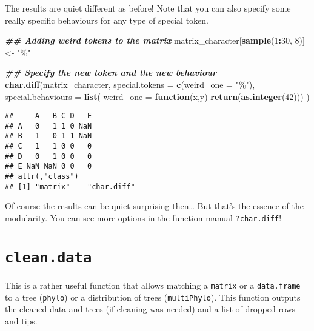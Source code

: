 \documentclass[
]{book}
\newenvironment{Shaded}{\begin{snugshade}}{\end{snugshade}}
\newcommand{\AttributeTok}[1]{\textcolor[rgb]{0.13,0.29,0.53}{#1}}
\newcommand{\ControlFlowTok}[1]{\textcolor[rgb]{0.13,0.29,0.53}{\textbf{#1}}}
\newcommand{\DecValTok}[1]{\textcolor[rgb]{0.00,0.00,0.81}{#1}}
\newcommand{\DocumentationTok}[1]{\textcolor[rgb]{0.56,0.35,0.01}{\textbf{\textit{#1}}}}
\newcommand{\FunctionTok}[1]{\textcolor[rgb]{0.13,0.29,0.53}{\textbf{#1}}}
\newcommand{\NormalTok}[1]{#1}
\newcommand{\OtherTok}[1]{\textcolor[rgb]{0.56,0.35,0.01}{#1}}
\newcommand{\SpecialCharTok}[1]{\textcolor[rgb]{0.81,0.36,0.00}{\textbf{#1}}}
\newcommand{\StringTok}[1]{\textcolor[rgb]{0.31,0.60,0.02}{#1}}
\begin{document}
The results are quiet different as before! Note that you can also specify some really specific behaviours for any type of special token.

\begin{Shaded}
\begin{Highlighting}[]
\DocumentationTok{\#\# Adding weird tokens to the matrix}
\NormalTok{matrix\_character[}\FunctionTok{sample}\NormalTok{(}\DecValTok{1}\SpecialCharTok{:}\DecValTok{30}\NormalTok{, }\DecValTok{8}\NormalTok{)] }\OtherTok{\textless{}{-}} \StringTok{"\%"}

\DocumentationTok{\#\# Specify the new token and the new behaviour}
\FunctionTok{char.diff}\NormalTok{(matrix\_character, }\AttributeTok{special.tokens =} \FunctionTok{c}\NormalTok{(}\AttributeTok{weird\_one =} \StringTok{"\%"}\NormalTok{),}
                            \AttributeTok{special.behaviours =} \FunctionTok{list}\NormalTok{(}
                                \AttributeTok{weird\_one =} \ControlFlowTok{function}\NormalTok{(x,y) }\FunctionTok{return}\NormalTok{(}\FunctionTok{as.integer}\NormalTok{(}\DecValTok{42}\NormalTok{)))}
\NormalTok{                            )}
\end{Highlighting}
\end{Shaded}

\begin{verbatim}
##     A   B C D   E
## A   0   1 1 0 NaN
## B   1   0 1 1 NaN
## C   1   1 0 0   0
## D   0   1 0 0   0
## E NaN NaN 0 0   0
## attr(,"class")
## [1] "matrix"    "char.diff"
\end{verbatim}

Of course the results can be quiet surprising then\ldots{} But that's the essence of the modularity. You can see more options in the function manual \texttt{?char.diff}!

\hypertarget{clean.data}{%
\section{\texorpdfstring{\texttt{clean.data}}{clean.data}}\label{clean.data}}

This is a rather useful function that allows matching a \texttt{matrix} or a \texttt{data.frame} to a tree (\texttt{phylo}) or a distribution of trees (\texttt{multiPhylo}).
This function outputs the cleaned data and trees (if cleaning was needed) and a list of dropped rows and tips.
\end{document}
